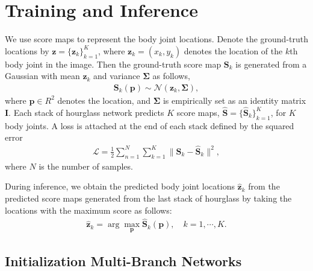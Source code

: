 \documentclass[10pt,twocolumn,letterpaper]{article}
\newcommand{\bS}{\mathbf{S}}
\newcommand{\bz}{\mathbf{z}}
\begin{document}




\section{Training and Inference}
We use score maps to represent the body joint locations. Denote the ground-truth locations by $ \mathbf{z} = \{\bz_k \}_{k=1}^K$, where $\bz_k=(x_k, y_k)$ denotes the location of the $k$th body joint in the image. Then the ground-truth score map $\bS_k$ is generated from a Gaussian with mean $\bz_k$ and variance $\boldsymbol\Sigma$ as follows,
{\small
\begin{align}
\mathbf{S}_k(\mathbf{p}) \sim \mathcal{N}(\mathbf{z}_k, \boldsymbol\Sigma),
\end{align}
}
\!\!where $\mathbf{p}\in R^2$ denotes the location, and $\boldsymbol\Sigma$ is empirically set as an identity matrix $\textbf{I}$. Each stack of hourglass network predicts $K$ score maps, \ie $\mathbf{\hat{S}} = \{\mathbf{\hat{S}}_k\}_{k=1}^K$, for $K$ body joints. A loss is attached at the end of each stack defined by the squared error
{\small
\begin{align}
\mathcal{L} = \frac{1}{2} \sum_{n=1}^N \sum_{k=1}^{K} \|\mathbf{S}_k - \mathbf{\hat{S}}_k\|^2,
\end{align}
}
\!\!where $N$ is the number of samples.

During inference, we obtain the predicted body joint locations $\hat{\bz}_k$ from the predicted score maps generated from the last stack of hourglass by taking the locations with the maximum score as follows:
{\small
\begin{align}
\hat{\bz}_k = \arg \max_{\mathbf{p}} \mathbf{\hat{S}}_k(\mathbf{p}), \quad k = 1, \cdots, K.
\end{align}
}

\vspace{-1em}
\subsection{Initialization Multi-Branch Networks}


\end{document}
